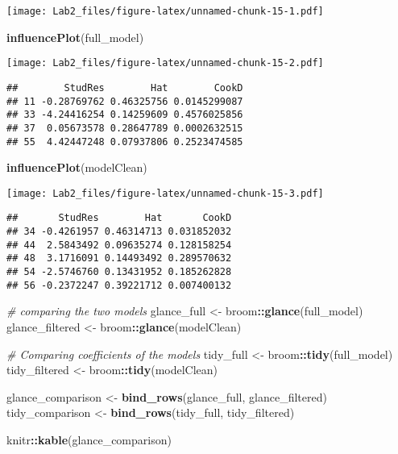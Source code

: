 \documentclass[
]{article}
\newenvironment{Shaded}{\begin{snugshade}}{\end{snugshade}}
\newcommand{\CommentTok}[1]{\textcolor[rgb]{0.56,0.35,0.01}{\textit{#1}}}
\newcommand{\FunctionTok}[1]{\textcolor[rgb]{0.13,0.29,0.53}{\textbf{#1}}}
\newcommand{\NormalTok}[1]{#1}
\newcommand{\OtherTok}[1]{\textcolor[rgb]{0.56,0.35,0.01}{#1}}
\newcommand{\SpecialCharTok}[1]{\textcolor[rgb]{0.81,0.36,0.00}{\textbf{#1}}}
\begin{document}
\texttt{[image: Lab2\_files/figure-latex/unnamed-chunk-15-1.pdf]}

\begin{Shaded}
\begin{Highlighting}[]
\FunctionTok{influencePlot}\NormalTok{(full\_model)}
\end{Highlighting}
\end{Shaded}

\texttt{[image: Lab2\_files/figure-latex/unnamed-chunk-15-2.pdf]}

\begin{verbatim}
##        StudRes        Hat        CookD
## 11 -0.28769762 0.46325756 0.0145299087
## 33 -4.24416254 0.14259609 0.4576025856
## 37  0.05673578 0.28647789 0.0002632515
## 55  4.42447248 0.07937806 0.2523474585
\end{verbatim}

\begin{Shaded}
\begin{Highlighting}[]
\FunctionTok{influencePlot}\NormalTok{(modelClean)}
\end{Highlighting}
\end{Shaded}

\texttt{[image: Lab2\_files/figure-latex/unnamed-chunk-15-3.pdf]}

\begin{verbatim}
##       StudRes        Hat       CookD
## 34 -0.4261957 0.46314713 0.031852032
## 44  2.5843492 0.09635274 0.128158254
## 48  3.1716091 0.14493492 0.289570632
## 54 -2.5746760 0.13431952 0.185262828
## 56 -0.2372247 0.39221712 0.007400132
\end{verbatim}

\begin{Shaded}
\begin{Highlighting}[]
\CommentTok{\# comparing the two models}
\NormalTok{glance\_full }\OtherTok{\textless{}{-}}\NormalTok{ broom}\SpecialCharTok{::}\FunctionTok{glance}\NormalTok{(full\_model)}
\NormalTok{glance\_filtered }\OtherTok{\textless{}{-}}\NormalTok{ broom}\SpecialCharTok{::}\FunctionTok{glance}\NormalTok{(modelClean)}

\CommentTok{\# Comparing coefficients of the models}
\NormalTok{tidy\_full }\OtherTok{\textless{}{-}}\NormalTok{ broom}\SpecialCharTok{::}\FunctionTok{tidy}\NormalTok{(full\_model)}
\NormalTok{tidy\_filtered }\OtherTok{\textless{}{-}}\NormalTok{ broom}\SpecialCharTok{::}\FunctionTok{tidy}\NormalTok{(modelClean)}

\NormalTok{glance\_comparison }\OtherTok{\textless{}{-}} \FunctionTok{bind\_rows}\NormalTok{(glance\_full, glance\_filtered)}
\NormalTok{tidy\_comparison }\OtherTok{\textless{}{-}} \FunctionTok{bind\_rows}\NormalTok{(tidy\_full, tidy\_filtered)}

\NormalTok{knitr}\SpecialCharTok{::}\FunctionTok{kable}\NormalTok{(glance\_comparison)}
\end{Highlighting}
\end{Shaded}
\end{document}
